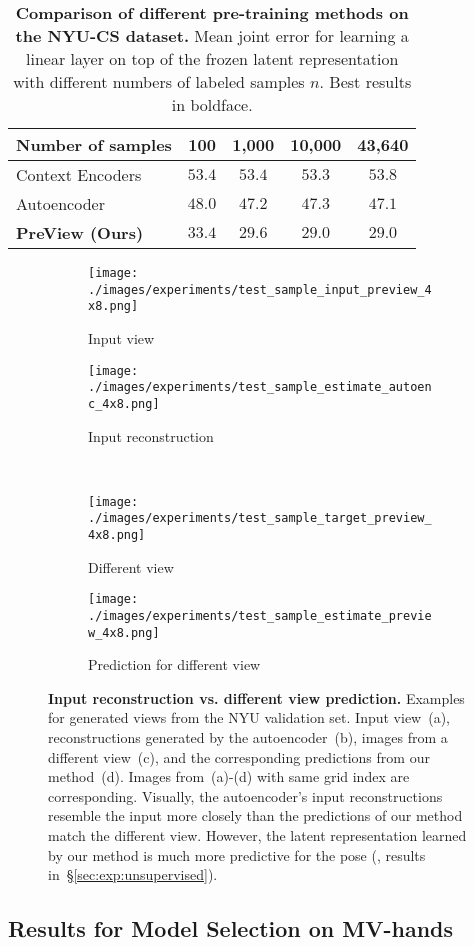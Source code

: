\documentclass[10pt,twocolumn,letterpaper]{article}
\begin{document}
\begin{table}[t]
\begin{center}
\begin{tabular}{l c c c c}
\toprule
Number of samples & 100 & 1,000 & 10,000 & 43,640 \\
\midrule
Context Encoders~\cite{Pathak2016cvpr_contextencoders} & $53.4$ & $53.4$ & $53.3$ & $53.8$ \\
Autoencoder & $48.0$ & $47.2$ & $47.3$ & $47.1$ \\ 
\textbf{PreView (Ours)} & $\mathbf{33.4}$ & $\mathbf{29.6}$ & $\mathbf{29.0}$ & $\mathbf{29.0}$ \\
\bottomrule
\end{tabular}
\end{center}
\caption{
  \textbf{Comparison of different pre-training methods on the NYU-CS dataset.}
  Mean joint error for learning a 
  linear layer on top of the frozen latent representation
  with different numbers of labeled samples $n$.
  Best results in boldface.
  }
\label{tab:sup:unsupervised}
\end{table}\begin{figure*}[t]
  \centering
  \begin{subfigure}{0.48\textwidth}
    \texttt{[image: ./images/experiments/test\_sample\_input\_preview\_4x8.png]}
    \caption{Input view}
  \end{subfigure}
  \quad
  \begin{subfigure}{0.48\textwidth}
    \texttt{[image: ./images/experiments/test\_sample\_estimate\_autoenc\_4x8.png]}
    \caption{Input reconstruction}
  \end{subfigure}
  \\
  \begin{subfigure}{0.48\textwidth}
    \texttt{[image: ./images/experiments/test\_sample\_target\_preview\_4x8.png]}
    \caption{Different view}
  \end{subfigure}
  \quad
  \begin{subfigure}{0.48\textwidth}
    \texttt{[image: ./images/experiments/test\_sample\_estimate\_preview\_4x8.png]}
    \caption{Prediction for different view}
  \end{subfigure}
  \caption{\textbf{Input reconstruction vs. different view prediction.}
  Examples for generated views from the NYU validation set. 
  Input view~(a), reconstructions generated by the autoencoder~(b), 
  images from a different view~(c), 
  and the corresponding predictions from our method~(d).
  Images from~(a)-(d) with same grid index are corresponding.
  Visually, the autoencoder's input reconstructions resemble the input more closely
  than the predictions of our method match the different view.
  However, the latent representation learned by our method is much more predictive for the pose 
  (\cf, results in~\S\ref{sec:exp:unsupervised}).}
  \label{fig:predictedviewsnyu}
\end{figure*}\subsection{Results for Model Selection on MV-hands}\label{sec:sup:novalmvhands}
\end{document}
